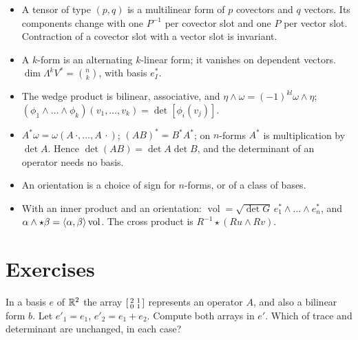 \begin{notechapter}
\begin{chaptersummary}
\begin{itemize}[nosep]
  \item A tensor of type $(p, q)$ is a multilinear form of $p$ covectors
        and $q$ vectors. Its components change with one $P^{-1}$ per
        covector slot and one $P$ per vector slot. Contraction of a
        covector slot with a vector slot is invariant.
  \item A $k$-form is an alternating $k$-linear form; it vanishes on
        dependent vectors. $\dim\Lambda^kV^* = \binom nk$, with basis
        $e_I^*$.
  \item The wedge product is bilinear, associative, and
        $\eta\wedge\omega = (-1)^{kl}\omega\wedge\eta$;
        $(\phi_1\wedge\dots\wedge\phi_k)(v_1,\dots,v_k)
        = \det[\phi_i(v_j)]$.
  \item $A^*\omega = \omega(A\,\cdot,\dots,A\,\cdot)$;
        $(AB)^* = B^*A^*$; on $n$-forms $A^*$ is multiplication by
        $\det A$. Hence $\det(AB) = \det A\det B$, and the determinant
        of an operator needs no basis.
  \item An orientation is a choice of sign for $n$-forms, or of a class
        of bases.
  \item With an inner product and an orientation:
        $\operatorname{vol} = \sqrt{\det G}\,e_1^*\wedge\dots\wedge e_n^*$,
        and $\alpha\wedge\star\beta = \left\langle \alpha, \beta \right\rangle\operatorname{vol}$.
        The cross product is $R^{-1}\star(Ru\wedge Rv)$.
\end{itemize}
\end{chaptersummary}

\section*{Exercises}

\begin{exercise}\label{multilinear-algebra:exr:1}
In a basis $e$ of $\mathbb{R}^2$ the array
$\begin{bsmallmatrix}2 & 1\\ 0 & 1\end{bsmallmatrix}$ represents an
operator $A$, and also a bilinear form $b$. Let $e'_1 = e_1$,
$e'_2 = e_1 + e_2$. Compute both arrays in $e'$. Which of trace and
determinant are unchanged, in each case?
\end{exercise}


\end{notechapter}
